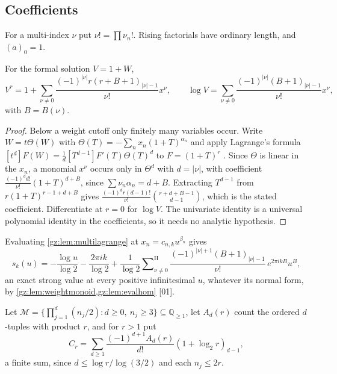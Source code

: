 \documentclass[11pt,a4paper]{article}
\numberwithin{equation}{section}
\theoremstyle{definition}
\theoremstyle{remark}
\newcommand{\Q}{\mathbb Q}
\newcommand{\Sh}{\mathop{\textstyle\sum}\nolimits^{\mathrm H}}
\newcommand{\src}[1]{\textup{[#1]}}
\begin{document}
\subsection{Coefficients}
For a multi-index $\nu$ put $\nu!=\prod\nu_n!$. Rising factorials have
ordinary length, and $(a)_0=1$.

\begin{lemma}[Weighted Lagrange formula \src{01}]\label{gz:lem:multilagrange}
For the formal solution $V=1+W$,
\[
V^r=1+\sum_{\nu\ne0}\frac{(-1)^{|\nu|}r(r+B+1)_{|\nu|-1}}{\nu!}x^\nu,\qquad
\log V=\sum_{\nu\ne0}\frac{(-1)^{|\nu|}(B+1)_{|\nu|-1}}{\nu!}x^\nu,
\]
with $B=B(\nu)$.
\end{lemma}
\begin{proof}
Below a weight cutoff only finitely many variables occur. Write
$W=t\Theta(W)$ with $\Theta(T)=-\sum_nx_n(1+T)^{\alpha_n}$ and apply Lagrange's
formula $[t^d]F(W)=\frac1d[T^{d-1}]F'(T)\Theta(T)^d$ to $F=(1+T)^r$
\cite{Gessel}. Since $\Theta$ is linear in the $x_n$, a monomial $x^\nu$
occurs only in $\Theta^d$ with $d=|\nu|$, with coefficient
$\frac{(-1)^dd!}{\nu!}(1+T)^{d+B}$, since $\sum\nu_n\alpha_n=d+B$. Extracting
$T^{d-1}$ from $r(1+T)^{r-1+d+B}$ gives
$\frac{(-1)^dr(d-1)!}{\nu!}\binom{r+d+B-1}{d-1}$, which is the stated
coefficient. Differentiate at $r=0$ for $\log V$. The univariate identity is
a universal polynomial identity in the coefficients, so it needs no analytic
hypothesis.
\end{proof}
Evaluating \cref{gz:lem:multilagrange} at $x_n=c_{n,k}u^{\beta_n}$ gives
\[
s_k(u)=-\frac{\log u}{\log2}-\frac{2\pi ik}{\log2}+\frac1{\log2}\Sh_{\nu\ne0}\frac{(-1)^{|\nu|+1}(B+1)_{|\nu|-1}}{\nu!}\,e^{2\pi ikB}u^B,
\]
an exact strong value at every positive infinitesimal $u$, whatever its
normal form, by \cref{gz:lem:weightmonoid,gz:lem:evalhom} \src{01}.

Let $\mathcal M=\{\prod_{j=1}^d(n_j/2):d\ge0,\ n_j\ge3\}\subseteq\Q_{\ge1}$,
let $A_d(r)$ count the ordered $d$-tuples with product $r$, and for $r>1$ put
\[
C_r=\sum_{d\ge1}\frac{(-1)^{d+1}A_d(r)}{d!}(1+\log_2r)_{d-1},
\]
a finite sum, since $d\le\log r/\log(3/2)$ and each $n_j\le2r$.
\end{document}
